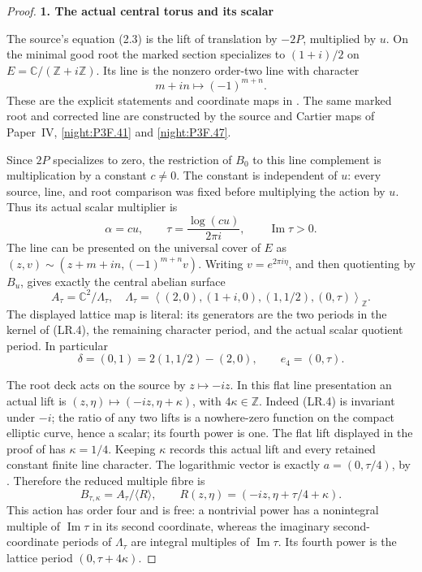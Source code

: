 \begin{proof}
\par

\medskip\noindent\textbf{1. The actual central torus and its scalar}

\par\nobreak

The source's equation (2.3) is the lift of translation by
\(-2P\), multiplied by \(u\). On the minimal good root the marked
section specializes to \((1+i)/2\) on
\(E=\mathbb C/(\mathbb Z+i\mathbb Z)\). Its line is the nonzero
order-two line with character
\[
                  m+in\longmapsto(-1)^{m+n}.          \tag{LR.4}
\]
These are the explicit statements and coordinate maps in
\cite[Lemma~2.7 and Corollary~2.8, pp.~6--7 of the attached-source edition]{LiuRollenske2026}. The same marked root and corrected line are constructed by the source and Cartier maps of Paper~IV, \ref{night:P3F.41} and \ref{night:P3F.47}.

Since \(2P\) specializes to zero, the restriction of \(B_0\) to
this line complement is multiplication by a constant \(c\ne0\).
The constant is independent of \(u\): every source, line, and root
comparison was fixed before multiplying the action by \(u\).
Thus its actual scalar multiplier is
\[
              \alpha=cu,\qquad
              \tau=\frac{\log(cu)}{2\pi i},
              \qquad\operatorname{Im}\tau>0.         \tag{LR.5}
\]
The line can be presented on the universal cover of \(E\) as
\((z,v)\sim(z+m+in,(-1)^{m+n}v)\). Writing
\(v=e^{2\pi i\eta}\), and then quotienting by \(B_u\), gives
exactly the central abelian surface
\[
 A_\tau=\mathbb C^2/\Lambda_\tau,
 \quad
 \Lambda_\tau=
 \left\langle
  (2,0),(1+i,0),(1,1/2),(0,\tau)
 \right\rangle_{\mathbb Z}.                           \tag{LR.6}
\]
The displayed lattice map is literal: its generators are the two
periods in the kernel of (LR.4), the remaining character period,
and the actual scalar quotient period. In particular
\[
 \delta=(0,1)=2(1,1/2)-(2,0),\qquad e_4=(0,\tau).
\]

The root deck acts on the source by \(z\mapsto-iz\). In this flat
line presentation an actual lift is
\((z,\eta)\mapsto(-iz,\eta+\kappa)\), with
\(4\kappa\in\mathbb Z\). Indeed (LR.4) is invariant under
\(-i\); the ratio of any two lifts is a nowhere-zero function on
the compact elliptic curve, hence a scalar; its fourth power is one.
The flat lift displayed in the proof of \cite[Proposition~3.9, p.~10 of the attached-source edition]{LiuRollenske2026} has \(\kappa=1/4\). Keeping \(\kappa\) records this actual lift and every retained constant finite line character. The logarithmic vector
is exactly \(a=(0,\tau/4)\), by \cite[Definition~3.7, p.~10 of the attached-source edition]{LiuRollenske2026}. Therefore the reduced multiple fibre is
\[
 B_{\tau,\kappa}=A_\tau/\langle R\rangle,
 \qquad R(z,\eta)=(-iz,\eta+\tau/4+\kappa).           \tag{LR.7}
\]
This action has order four and is free: a nontrivial power has a
nonintegral multiple of \(\operatorname{Im}\tau\) in its second
coordinate, whereas the imaginary second-coordinate periods of
\(\Lambda_\tau\) are integral multiples of
\(\operatorname{Im}\tau\). Its fourth power is the lattice period
\((0,\tau+4\kappa)\).


\end{proof}
